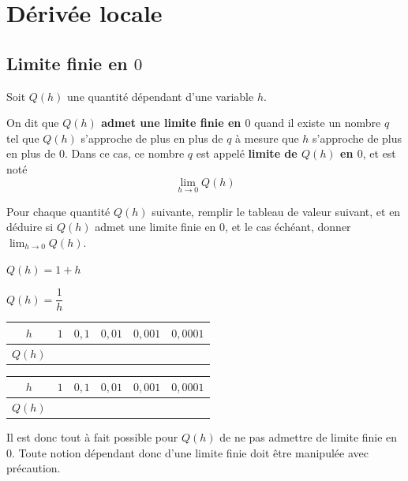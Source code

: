 \documentclass{article}
\begin{document}
\section{Dérivée locale}
\subsection{Limite finie en $0$}
Soit $Q(h)$ une quantité dépendant d'une variable $h$.
\begin{tcolorbox}
\begin{definition}
On dit que \textbf{$Q(h)$ admet une limite finie en $0$} quand il existe un nombre $q$ tel que $Q(h)$ s'approche de plus en plus de $q$ à mesure que $h$ s'approche de plus en plus de $0$. Dans ce cas, ce nombre $q$ est appelé \textbf{limite de $Q(h)$ en $0$}, et est noté
\begin{equation*}
\lim_{h \to 0} Q(h)
\end{equation*}
\end{definition}
\end{tcolorbox}
\begin{example}
Pour chaque quantité $Q(h)$ suivante, remplir le tableau de valeur suivant, et en déduire si $Q(h)$ admet une limite finie en $0$, et le cas échéant, donner $\lim_{h \to 0} Q(h)$.
\begin{enumquestions}
\item $Q(h) = 1 + h$
\item $Q(h) = \dfrac{1}{h}$
\end{enumquestions}
\begin{center}
\hfill
\begin{tabular}{|c|p{0.9cm}|p{0.9cm}|p{0.9cm}|p{0.9cm}|p{0.9cm}|}
\hline
$h$ & $1$ & $0,1$ & $0,01$ & $0,001$ & $0,0001$\\
\hline
$Q(h)$ &  &  &  &  & \\
\hline
\end{tabular}
\hfill
\begin{tabular}{|c|p{0.9cm}|p{0.9cm}|p{0.9cm}|p{0.9cm}|p{0.9cm}|}
\hline
$h$ & $1$ & $0,1$ & $0,01$ & $0,001$ & $0,0001$\\
\hline
$Q(h)$ &  &  &  &  & \\
\hline
\end{tabular}
\hfill
\end{center}
\emptybox{2cm}
\end{example}
\begin{remark}
Il est donc tout à fait possible pour $Q(h)$ de ne pas admettre de limite finie en $0$. Toute notion dépendant donc d'une limite finie doit être manipulée avec précaution.
\end{remark}
\end{document}
